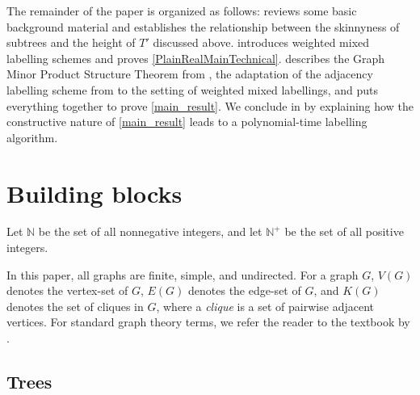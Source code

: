 \documentclass{patmorin}
\newcommand{\david}[1]{{\color{orange} DW: #1}}
\newcommand{\pat}[1]{\textcolor{Magenta}{PaMo: #1}}
\newcommand{\piotr}[1]{\textcolor{red}{PiMi: #1}}
\newcommand{\defin}[1]{\emph{\textcolor{brightmaroon}{#1}}}
\newcommand{\NN}{\mathbb{N}}
\begin{document}
  The remainder of the paper is organized as follows:   reviews some basic background material and establishes the relationship between the skinnyness of subtrees and the height of $T'$ discussed above.   introduces weighted mixed labelling schemes and proves \cref{PlainRealMainTechnical}.   describes the Graph Minor Product Structure Theorem from \cite{dujmovic.joret.ea:planar}, the adaptation of the adjacency labelling scheme from \cite{dujmovic.esperet.ea:adjacency} to the setting of weighted mixed labellings, and puts everything together to prove \cref{main_result}. We conclude in  by explaining how the constructive nature of \cref{main_result} leads to a 
polynomial-time labelling algorithm.

  \section{Building blocks}\label{building_blocks}

Let \defin{$\NN$} be the set of all nonnegative integers, and let \defin{$\NN^+$} be the set of all positive integers.

  In this paper, all graphs are finite, simple, and undirected.  For a graph $G$, \defin{$V(G)$} denotes the vertex-set of $G$, \defin{$E(G)$} denotes the edge-set of $G$, and \defin{$K(G)$} denotes the set of cliques in $G$, where a \defin{clique} is a set of pairwise adjacent vertices. For standard graph theory terms, we refer the reader to the textbook by \citet{diestel:graph}.




  \subsection{Trees}
\end{document}
